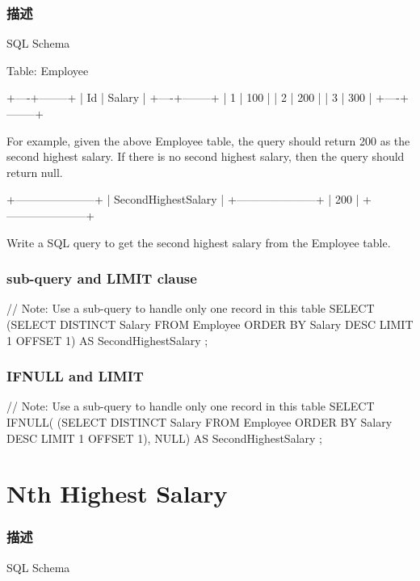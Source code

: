 \subsubsection{描述}
SQL Schema

Table: Employee
\begin{Code}
+----+--------+
| Id | Salary |
+----+--------+
| 1  | 100    |
| 2  | 200    |
| 3  | 300    |
+----+--------+
\end{Code}

For example, given the above Employee table, the query should return 200 as the second highest salary. If there is no second highest salary, then the query should return null.
\begin{Code}
+---------------------+
| SecondHighestSalary |
+---------------------+
| 200                 |
+---------------------+
\end{Code}

Write a SQL query to get the second highest salary from the Employee table.

\subsubsection{sub-query and LIMIT clause}
\begin{Code}
  // Note: Use a sub-query to handle only one record in this table
SELECT
    (SELECT DISTINCT
        Salary
     FROM
         Employee
     ORDER BY Salary DESC
     LIMIT 1 OFFSET 1) AS SecondHighestSalary
;
\end{Code}

\subsubsection{IFNULL and LIMIT}
\begin{Code}
  // Note: Use a sub-query to handle only one record in this table
SELECT
    IFNULL(
      (SELECT DISTINCT
           Salary
       FROM
           Employee
       ORDER BY Salary DESC
       LIMIT 1 OFFSET 1),
    NULL) AS SecondHighestSalary
;
\end{Code}

\section{Nth Highest Salary} %
\label{sec:nth-highest-salary}


\subsubsection{描述}
SQL Schema

